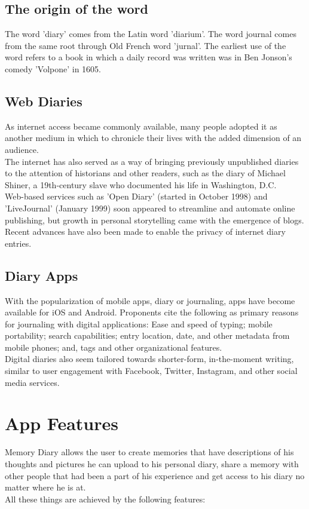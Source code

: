 \documentclass{article}
\begin{document}
\subsection{The origin of the word}
The word 'diary' comes from the Latin word 'diarium'. The word journal comes from the same root through Old French word 'jurnal'. The earliest use of the word refers to a book in which a daily record was written was in Ben Jonson's comedy 'Volpone' in 1605.
\subsection{Web Diaries}
As internet access became commonly available, many people adopted it as another medium in which to chronicle their lives with the added dimension of an audience.\\
The internet has also served as a way of bringing previously unpublished diaries to the attention of historians and other readers, such as the diary of Michael Shiner, a 19th-century slave who documented his life in Washington, D.C.\\
Web-based services such as 'Open Diary' (started in October 1998) and 'LiveJournal' (January 1999) soon appeared to streamline and automate online publishing, but growth in personal storytelling came with the emergence of blogs. Recent advances have also been made to enable the privacy of internet diary entries.
\subsection{Diary Apps}
With the popularization of mobile apps, diary or journaling, apps have become available for iOS and Android. Proponents cite the following as primary reasons for journaling with digital applications: Ease and speed of typing; mobile portability; search capabilities; entry location, date, and other metadata from mobile phones; and, tags and other organizational features.\\
Digital diaries also seem tailored towards shorter-form, in-the-moment writing, similar to user engagement with Facebook, Twitter, Instagram, and other social media services.

\section{App Features}
Memory Diary allows the user to create memories that have descriptions of his thoughts and pictures he can upload to his personal diary, share a memory with other people that had been a part of his experience and get access to his diary no matter where he is at.\\
All these things are achieved by the following features:
\end{document}
